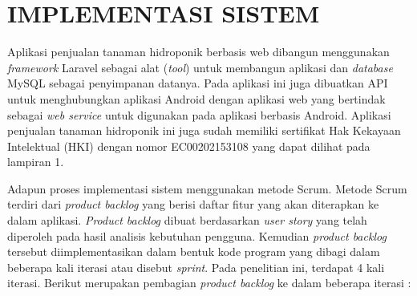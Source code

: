 \section{\uppercase{Implementasi Sistem}}
Aplikasi penjualan tanaman hidroponik berbasis web dibangun
menggunakan \textit{framework} Laravel sebagai alat (\textit{tool}) untuk membangun aplikasi dan \textit{database} MySQL sebagai penyimpanan datanya. Pada aplikasi ini juga dibuatkan API untuk menghubungkan aplikasi Android dengan aplikasi web yang bertindak sebagai \textit{web service} untuk digunakan pada aplikasi berbasis Android. Aplikasi penjualan tanaman hidroponik ini juga sudah memiliki sertifikat Hak Kekayaan Intelektual (HKI) dengan nomor EC00202153108 yang dapat dilihat pada lampiran 1.


\par Adapun proses implementasi sistem menggunakan metode Scrum. Metode Scrum terdiri dari \textit{product backlog} yang berisi daftar fitur yang akan diterapkan ke dalam aplikasi. \textit{Product backlog} dibuat berdasarkan \textit{user story} yang telah diperoleh pada hasil analisis kebutuhan pengguna. Kemudian \textit{product backlog} tersebut diimplementasikan dalam bentuk kode program yang dibagi dalam beberapa kali iterasi atau disebut \textit{sprint}. Pada penelitian ini, terdapat 4 kali iterasi. Berikut merupakan pembagian \textit{product backlog} ke dalam beberapa iterasi :




